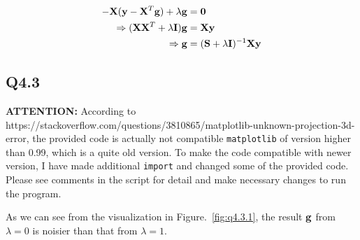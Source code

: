 \documentclass[11pt]{article}
\newcommand{\code}[1]{\texttt{#1}}
\begin{document}
\begin{align}
    -\mathbf{X}(\mathbf{y}-\mathbf{X}^T\mathbf{g}) + \lambda \mathbf{g} &= \mathbf{0} \\
    \Rightarrow (\mathbf{X}\mathbf{X}^T+\lambda\mathbf{I})\mathbf{g} &= \mathbf{X}\mathbf{y} \\
    \Rightarrow \mathbf{g} &= (\mathbf{S}+\lambda\mathbf{I})^{-1} \mathbf{X}\mathbf{y}
\end{align}

\newpage
\subsection*{Q4.3}

\textbf{ATTENTION: } According to https://stackoverflow.com/questions/3810865/matplotlib-unknown-projection-3d-error, the provided code is actually not compatible \code{matplotlib} of version higher than 0.99, which is a quite old version. To make the code compatible with newer version, I have made additional \code{import} and changed some of the provided code. Please see comments in the script for detail and make necessary changes to run the program.

As we can see from the visualization in Figure.~\ref{fig:q4.3.1}, the result $\mathbf{g}$ from $\lambda=0$ is noisier than that from $\lambda=1$.
\end{document}
